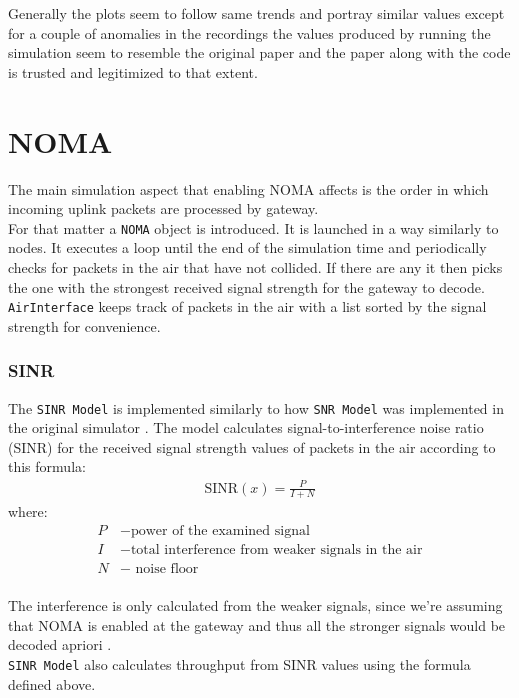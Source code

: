 Generally the plots seem to follow same trends and portray 
similar values except for a couple of anomalies in the
recordings the values produced by running the simulation
seem to resemble the original paper and the paper along with
the code is trusted and legitimized to that extent. 

\section{NOMA}
The main simulation aspect that enabling NOMA affects is the 
order in which incoming uplink packets are processed by 
gateway. \\

For that matter a \texttt{NOMA} object is introduced. It is 
launched in a way similarly to nodes. It executes a loop
until the end of the simulation time and periodically checks
for packets in the air that have not collided. If there are any
it then picks the one with the strongest received signal 
strength for the gateway to decode. \texttt{AirInterface} keeps
track of packets in the air with a list sorted by the signal
strength for convenience. 

\subsubsection{SINR}
The \texttt{SINR Model} is implemented similarly to how \texttt{SNR Model} was implemented in the original simulator \cite{simulator}. The model calculates signal-to-interference noise ratio (SINR) for the received signal strength values of packets in the air according to this formula:
\begin{align}
    \text{SINR}(x) = \frac{P}{I + N} \label{eq:sinr}
\end{align}
where:
\begin{align*}
     P &- \text{power of the examined signal}\\
     I &- \text{total interference from weaker signals in the air}\\
     N &- \text{ noise floor}\\
\end{align*}

The interference is only calculated from the weaker signals, since we're assuming that NOMA is enabled at 
the gateway and thus all the stronger signals would be
decoded apriori \cite{noma_original}.\\

\texttt{SINR Model} also calculates throughput from SINR values using the formula defined above.

